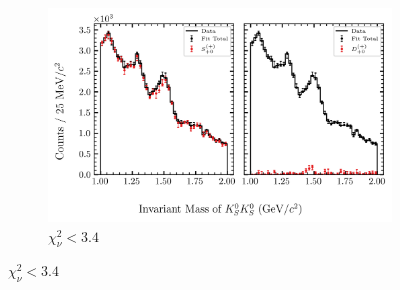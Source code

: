 \begin{figure}[htbp]
    \begin{subfigure}{0.8\textwidth}
        \includegraphics[width=\linewidth]{figures/binned_fit_chisqdof_3.4_splot_D_1s_2b_phase_factor_waves487_uncertainty_bootstrap-CI-BC.png}
        \caption{$\chi^2_\nu < 3.4$}
    \end{subfigure}

    \vspace{1em}


\end{figure}
